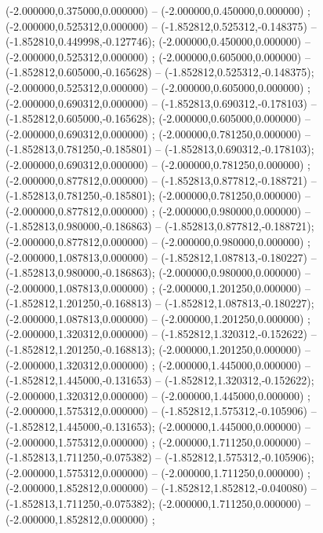  (-2.000000,0.375000,0.000000) -- (-2.000000,0.450000,0.000000) ;
 (-2.000000,0.525312,0.000000) -- (-1.852812,0.525312,-0.148375) -- (-1.852810,0.449998,-0.127746);
 (-2.000000,0.450000,0.000000) -- (-2.000000,0.525312,0.000000) ;
 (-2.000000,0.605000,0.000000) -- (-1.852812,0.605000,-0.165628) -- (-1.852812,0.525312,-0.148375);
 (-2.000000,0.525312,0.000000) -- (-2.000000,0.605000,0.000000) ;
 (-2.000000,0.690312,0.000000) -- (-1.852813,0.690312,-0.178103) -- (-1.852812,0.605000,-0.165628);
 (-2.000000,0.605000,0.000000) -- (-2.000000,0.690312,0.000000) ;
 (-2.000000,0.781250,0.000000) -- (-1.852813,0.781250,-0.185801) -- (-1.852813,0.690312,-0.178103);
 (-2.000000,0.690312,0.000000) -- (-2.000000,0.781250,0.000000) ;
 (-2.000000,0.877812,0.000000) -- (-1.852813,0.877812,-0.188721) -- (-1.852813,0.781250,-0.185801);
 (-2.000000,0.781250,0.000000) -- (-2.000000,0.877812,0.000000) ;
 (-2.000000,0.980000,0.000000) -- (-1.852813,0.980000,-0.186863) -- (-1.852813,0.877812,-0.188721);
 (-2.000000,0.877812,0.000000) -- (-2.000000,0.980000,0.000000) ;
 (-2.000000,1.087813,0.000000) -- (-1.852812,1.087813,-0.180227) -- (-1.852813,0.980000,-0.186863);
 (-2.000000,0.980000,0.000000) -- (-2.000000,1.087813,0.000000) ;
 (-2.000000,1.201250,0.000000) -- (-1.852812,1.201250,-0.168813) -- (-1.852812,1.087813,-0.180227);
 (-2.000000,1.087813,0.000000) -- (-2.000000,1.201250,0.000000) ;
 (-2.000000,1.320312,0.000000) -- (-1.852812,1.320312,-0.152622) -- (-1.852812,1.201250,-0.168813);
 (-2.000000,1.201250,0.000000) -- (-2.000000,1.320312,0.000000) ;
 (-2.000000,1.445000,0.000000) -- (-1.852812,1.445000,-0.131653) -- (-1.852812,1.320312,-0.152622);
 (-2.000000,1.320312,0.000000) -- (-2.000000,1.445000,0.000000) ;
 (-2.000000,1.575312,0.000000) -- (-1.852812,1.575312,-0.105906) -- (-1.852812,1.445000,-0.131653);
 (-2.000000,1.445000,0.000000) -- (-2.000000,1.575312,0.000000) ;
 (-2.000000,1.711250,0.000000) -- (-1.852813,1.711250,-0.075382) -- (-1.852812,1.575312,-0.105906);
 (-2.000000,1.575312,0.000000) -- (-2.000000,1.711250,0.000000) ;
 (-2.000000,1.852812,0.000000) -- (-1.852812,1.852812,-0.040080) -- (-1.852813,1.711250,-0.075382);
 (-2.000000,1.711250,0.000000) -- (-2.000000,1.852812,0.000000) ;
